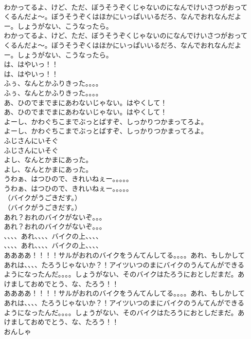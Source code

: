 \documentclass[8pt]{extreport}
\begin{document}
\begin{CJK}{UTF8}{min}
\\	わかってるよ、けど、ただ、ぼうそうぞくじゃないのになんでけいさつがおってくるんだよ〜。ぼうそうぞくはほかにいっぱいいるだろ、なんでおれなんだよー。しょうがない、こうなったら。
\\	わかってるよ、けど、ただ、ぼうそうぞくじゃないのになんでけいさつがおってくるんだよ〜。ぼうそうぞくはほかにいっぱいいるだろ、なんでおれなんだよー。しょうがない、こうなったら。
\\	は、はやいっ！！
\\	は、はやいっ！！
\\	ふぅ、なんとかふりきった。。。。
\\	ふぅ、なんとかふりきった。。。。
\\	あ、ひのでまでまにあわないじゃない。はやくして！
\\	あ、ひのでまでまにあわないじゃない。はやくして！
\\	よーし、かわぐちこまでぶっとばすぞ、しっかりつかまってろよ。
\\	よーし、かわぐちこまでぶっとばすぞ、しっかりつかまってろよ。
\\	ふじさんにいそぐ
\\	ふじさんにいそぐ
\\	よし、なんとかまにあった。
\\	よし、なんとかまにあった。
\\	うわぁ、はつひので、きれいねぇー。。。。。
\\	うわぁ、はつひので、きれいねぇー。。。。。
\\	（バイクがうごきだす。）
\\	（バイクがうごきだす。）
\\	あれ？おれのバイクがないぞ。。。
\\	あれ？おれのバイクがないぞ。。。
\\	、、、、あれ、、、、バイクの上、、、、
\\	、、、、あれ、、、、バイクの上、、、、
\\	ああああ！！！！サルがおれのバイクをうんてんしてる。。。。あれ、もしかしてあれは、、、、たろうじゃないか？！アイツいつのまにバイクのうんてんができるようになったんだ。。。。しょうがない、そのバイクはたろうにおとしだまだ。あけましておめでとう、な、たろう！！
\\	ああああ！！！！サルがおれのバイクをうんてんしてる。。。。あれ、もしかしてあれは、、、、たろうじゃないか？！アイツいつのまにバイクのうんてんができるようになったんだ。。。。しょうがない、そのバイクはたろうにおとしだまだ。あけましておめでとう、な、たろう！！
\\	おんしゃ

\end{CJK}
\end{document}
